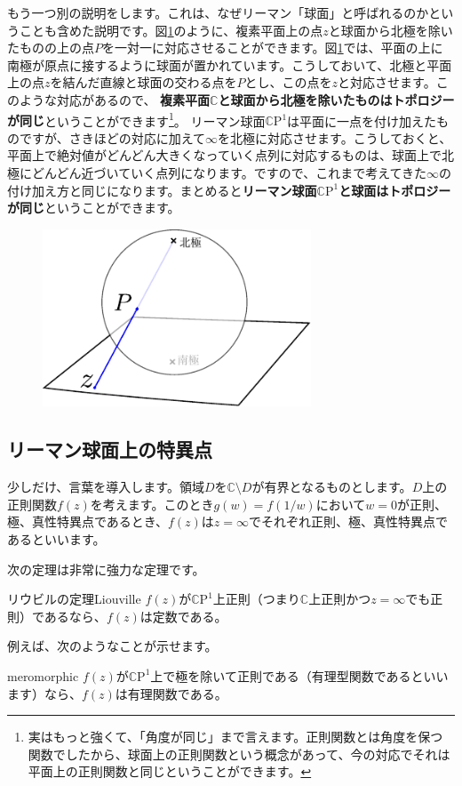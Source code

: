 \documentclass[report,paper=a4, fontsize=12pt, line_length=16cm, number_of_lines=33,dvipdfmx]{jlreq}
\numberwithin{equation}{section}
\newcommand{\Cb}{\mathbb{C}}
\newcommand{\CP}{\Cb \mathrm{P}}
\newcommand{\strong}[1]{\textsf{\bfseries #1}}
\begin{document}
もう一つ別の説明をします。これは、なぜリーマン「球面」と呼ばれるのかということも含めた説明です。図\ref{fig:riemannsphere}のように、複素平面上の点$z$と球面から北極を除いたものの上の点$P$を一対一に対応させることができます。図\ref{fig:riemannsphere}では、平面の上に南極が原点に接するように球面が置かれています。こうしておいて、北極と平面上の点$z$を結んだ直線と球面の交わる点を$P$とし、この点を$z$と対応させます。このような対応があるので、
\strong{複素平面$\Cb$と球面から北極を除いたものはトポロジーが同じ}ということができます\footnote{実はもっと強くて、「角度が同じ」まで言えます。正則関数とは角度を保つ関数でしたから、球面上の正則関数という概念があって、今の対応でそれは平面上の正則関数と同じということができます。}。
リーマン球面$\CP^1$は平面に一点を付け加えたものですが、さきほどの対応に加えて$\infty$を北極に対応させます。こうしておくと、平面上で絶対値がどんどん大きくなっていく点列に対応するものは、球面上で北極にどんどん近づいていく点列になります。ですので、これまで考えてきた$\infty$の付け加え方と同じになります。まとめると\strong{リーマン球面$\CP^1$と球面はトポロジーが同じ}ということができます。
\begin{figure}[htbp]
  \centering
  \includegraphics[width=8cm]{riemannsphere.pdf}
  \caption{}
  \label{fig:riemannsphere}
\end{figure}

\subsection{リーマン球面上の特異点}
少しだけ、言葉を導入します。領域$D$を$\Cb\setminus D$が有界となるものとします。$D$上の正則関数$f(z)$を考えます。このとき$g(w)=f(1/w)$において$w=0$が正則、極、真性特異点であるとき、$f(z)$は$z=\infty$でそれぞれ正則、極、真性特異点であるといいます。

次の定理は非常に強力な定理です。
\begin{theor}{リウビルの定理}{Liouville}
  $f(z)$が$\CP^1$上正則（つまり$\Cb$上正則かつ$z=\infty$でも正則）であるなら、$f(z)$は定数である。
\end{theor}
例えば、次のようなことが示せます。
\begin{col}{}{meromorphic}
  $f(z)$が$\CP^1$上で極を除いて正則である（有理型関数であるといいます）なら、$f(z)$は有理関数である。
\end{col}
\end{document}
